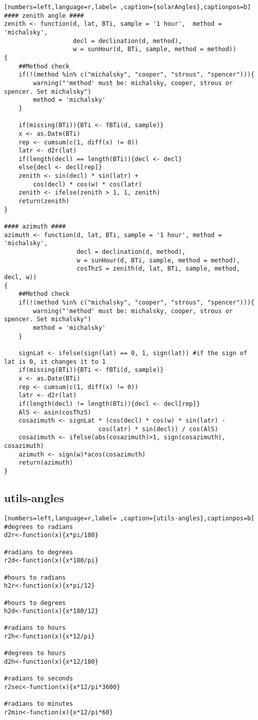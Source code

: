 \begin{lstlisting}[numbers=left,language=r,label= ,caption={solarAngles},captionpos=b]
#### zenith angle ####
zenith <- function(d, lat, BTi, sample = '1 hour',  method = 'michalsky',
                   decl = declination(d, method),
                   w = sunHour(d, BTi, sample, method = method))
{
    ##Method check
    if(!(method %in% c("michalsky", "cooper", "strous", "spencer"))){
        warning("'method' must be: michalsky, cooper, strous or spencer. Set michalsky")
        method = 'michalsky'
    }

    if(missing(BTi)){BTi <- fBTi(d, sample)}
    x <- as.Date(BTi)
    rep <- cumsum(c(1, diff(x) != 0))
    latr <- d2r(lat)
    if(length(decl) == length(BTi)){decl <- decl}
    else{decl <- decl[rep]}
    zenith <- sin(decl) * sin(latr) +
        cos(decl) * cos(w) * cos(latr)
    zenith <- ifelse(zenith > 1, 1, zenith)
    return(zenith)
}

#### azimuth ####
azimuth <- function(d, lat, BTi, sample = '1 hour', method = 'michalsky',
                    decl = declination(d, method),
                    w = sunHour(d, BTi, sample, method = method),
                    cosThzS = zenith(d, lat, BTi, sample, method, decl, w))
{
    ##Method check
    if(!(method %in% c("michalsky", "cooper", "strous", "spencer"))){
        warning("'method' must be: michalsky, cooper, strous or spencer. Set michalsky")
        method = 'michalsky'
    }

    signLat <- ifelse(sign(lat) == 0, 1, sign(lat)) #if the sign of lat is 0, it changes it to 1
    if(missing(BTi)){BTi <- fBTi(d, sample)}
    x <- as.Date(BTi)
    rep <- cumsum(c(1, diff(x) != 0))
    latr <- d2r(lat)
    if(length(decl) != length(BTi)){decl <- decl[rep]}
    AlS <- asin(cosThzS)
    cosazimuth <- signLat * (cos(decl) * cos(w) * sin(latr) -
                          cos(latr) * sin(decl)) / cos(AlS)
    cosazimuth <- ifelse(abs(cosazimuth)>1, sign(cosazimuth), cosazimuth)
    azimuth <- sign(w)*acos(cosazimuth)
    return(azimuth)
}
\end{lstlisting}
\subsection{utils-angles}
\label{sec:org7a28d54}
\begin{lstlisting}[numbers=left,language=r,label= ,caption={utils-angles},captionpos=b]
#degrees to radians
d2r<-function(x){x*pi/180}

#radians to degrees
r2d<-function(x){x*180/pi}

#hours to radians
h2r<-function(x){x*pi/12}

#hours to degrees
h2d<-function(x){x*180/12}

#radians to hours
r2h<-function(x){x*12/pi}

#degrees to hours
d2h<-function(x){x*12/180}

#radians to seconds
r2sec<-function(x){x*12/pi*3600}

#radians to minutes
r2min<-function(x){x*12/pi*60}
\end{lstlisting}
